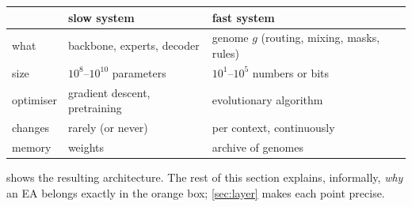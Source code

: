\documentclass[11pt,a4paper]{article}
\theoremstyle{definition}
\theoremstyle{plain}
\theoremstyle{remark}
\newcommand{\fast}[1]{\textcolor{fast}{#1}}
\newcommand{\slowc}[1]{\textcolor{slow}{#1}}
\newcommand{\memc}[1]{\textcolor{mem}{#1}}
\begin{document}
\begin{center}
\begin{tabular}{@{}lll@{}}
\toprule
 & \slowc{\textbf{slow system}} & \fast{\textbf{fast system}} \\
\midrule
what & backbone, experts, decoder & genome $g$ (routing, mixing, masks, rules) \\
size & $10^8$--$10^{10}$ parameters & $10^1$--$10^5$ numbers or bits \\
optimiser & gradient descent, pretraining & evolutionary algorithm \\
changes & rarely (or never) & per context, continuously \\
memory & weights & \memc{archive of genomes} \\
\bottomrule
\end{tabular}
\end{center}

 shows the resulting architecture. The rest of this section explains, informally, \emph{why} an EA belongs exactly in the orange box; \cref{sec:layer} makes each point precise.
\end{document}
